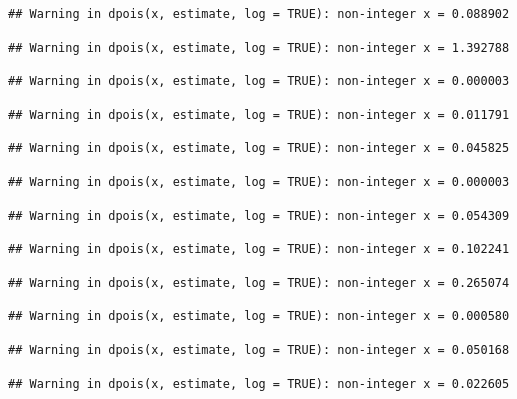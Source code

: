 \documentclass[]{article}
\begin{document}
\begin{verbatim}
## Warning in dpois(x, estimate, log = TRUE): non-integer x = 0.088902
\end{verbatim}

\begin{verbatim}
## Warning in dpois(x, estimate, log = TRUE): non-integer x = 1.392788
\end{verbatim}

\begin{verbatim}
## Warning in dpois(x, estimate, log = TRUE): non-integer x = 0.000003
\end{verbatim}

\begin{verbatim}
## Warning in dpois(x, estimate, log = TRUE): non-integer x = 0.011791
\end{verbatim}

\begin{verbatim}
## Warning in dpois(x, estimate, log = TRUE): non-integer x = 0.045825
\end{verbatim}

\begin{verbatim}
## Warning in dpois(x, estimate, log = TRUE): non-integer x = 0.000003
\end{verbatim}

\begin{verbatim}
## Warning in dpois(x, estimate, log = TRUE): non-integer x = 0.054309
\end{verbatim}

\begin{verbatim}
## Warning in dpois(x, estimate, log = TRUE): non-integer x = 0.102241
\end{verbatim}

\begin{verbatim}
## Warning in dpois(x, estimate, log = TRUE): non-integer x = 0.265074
\end{verbatim}

\begin{verbatim}
## Warning in dpois(x, estimate, log = TRUE): non-integer x = 0.000580
\end{verbatim}

\begin{verbatim}
## Warning in dpois(x, estimate, log = TRUE): non-integer x = 0.050168
\end{verbatim}

\begin{verbatim}
## Warning in dpois(x, estimate, log = TRUE): non-integer x = 0.022605
\end{verbatim}
\end{document}
